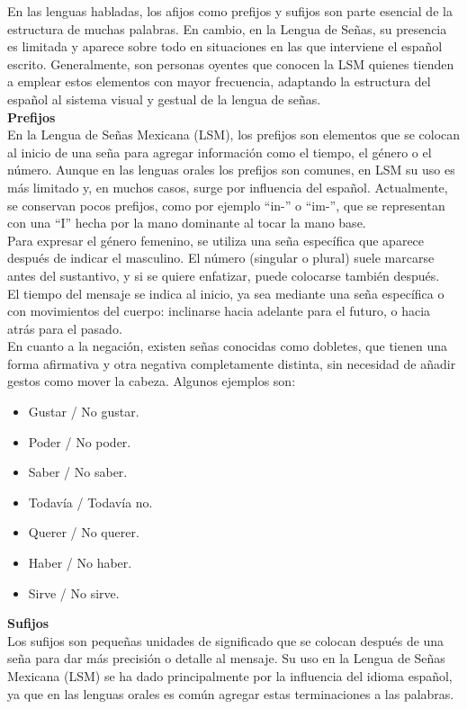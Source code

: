 En las lenguas habladas, los afijos como prefijos y sufijos son parte esencial de la estructura de muchas palabras. En cambio, en la Lengua de Señas, su presencia es limitada y aparece sobre todo en situaciones en las que interviene el español escrito. Generalmente, son personas oyentes que conocen la LSM quienes tienden a emplear estos elementos con mayor frecuencia, adaptando la estructura del español al sistema visual y gestual de la lengua de señas.\\

\textbf{Prefijos}\\
En la Lengua de Señas Mexicana (LSM), los prefijos son elementos que se colocan al inicio de una seña para agregar información como el tiempo, el género o el número. Aunque en las lenguas orales los prefijos son comunes, en LSM su uso es más limitado y, en muchos casos, surge por influencia del español. Actualmente, se conservan pocos prefijos, como por ejemplo “in-” o “im-”, que se representan con una “I” hecha por la mano dominante al tocar la mano base.\\

Para expresar el género femenino, se utiliza una seña específica que aparece después de indicar el masculino. El número (singular o plural) suele marcarse antes del sustantivo, y si se quiere enfatizar, puede colocarse también después.\\

El tiempo del mensaje se indica al inicio, ya sea mediante una seña específica o con movimientos del cuerpo: inclinarse hacia adelante para el futuro, o hacia atrás para el pasado.\\

En cuanto a la negación, existen señas conocidas como dobletes, que tienen una forma afirmativa y otra negativa completamente distinta, sin necesidad de añadir gestos como mover la cabeza. Algunos ejemplos son:
\begin{itemize}
    \item Gustar / No gustar.
    \item Poder / No poder.
    \item Saber / No saber.
    \item Todavía / Todavía no.
    \item Querer / No querer.
    \item Haber / No haber.
    \item Sirve / No sirve.
\end{itemize}

\textbf{Sufijos}\\
Los sufijos son pequeñas unidades de significado que se colocan después de una seña para dar más precisión o detalle al mensaje. Su uso en la Lengua de Señas Mexicana (LSM) se ha dado principalmente por la influencia del idioma español, ya que en las lenguas orales es común agregar estas terminaciones a las palabras.\\

